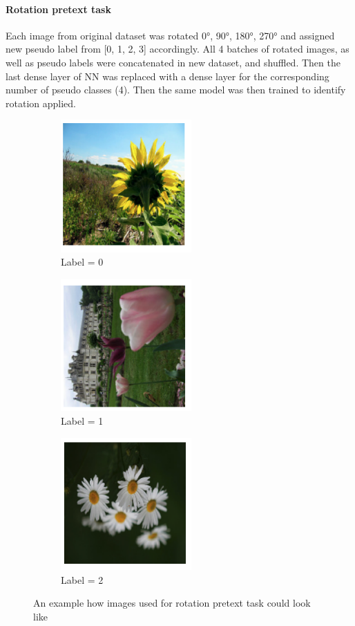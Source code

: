 \paragraph{Rotation pretext task}
Each image from original dataset was rotated 0°, 90°, 180°, 270° and assigned new pseudo label from [0, 1, 2, 3] accordingly.
All 4 batches of rotated images, as well as pseudo labels were concatenated in new dataset, and shuffled.
Then the last dense layer of NN was replaced with a dense layer for the corresponding number of pseudo classes (4).
Then the same model was then trained to identify rotation applied.
\begin{figure}[h]
    \begin{subfigure}{0.33\textwidth}
        \caption{Label = 0}
        \includegraphics[width=5cm]{images/rot_0}
    \end{subfigure}
    \begin{subfigure}{0.2\textwidth}
        \caption{Label = 1}
        \includegraphics[width=5cm]{images/rot_1}
    \end{subfigure}
    \begin{subfigure}{0.33\textwidth}
        \caption{Label = 2}
        \includegraphics[width=5cm]{images/rot_2}
    \end{subfigure}
    \caption{An example how images used for rotation pretext task could look like}
\end{figure}




